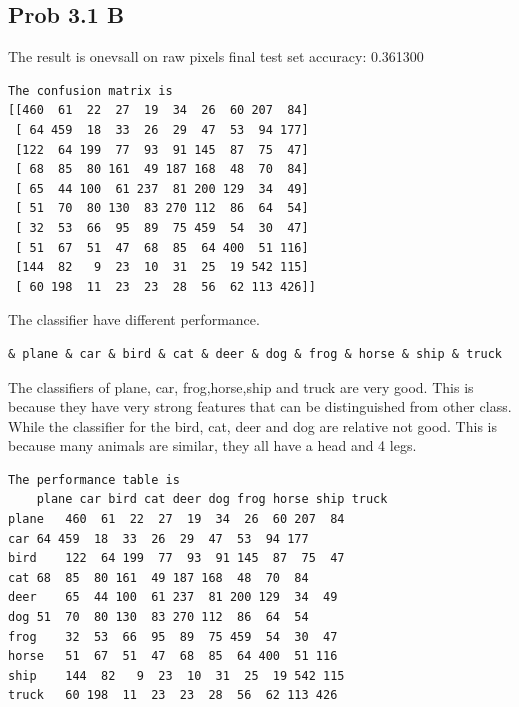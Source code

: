 \documentclass[pdftex,11pt]{article}
\begin{document}
\subsection{Prob 3.1 B }       
The result is 
onevsall on raw pixels final test set accuracy: 0.361300\\
\begin{lstlisting}    
The confusion matrix is 
[[460  61  22  27  19  34  26  60 207  84]
 [ 64 459  18  33  26  29  47  53  94 177]
 [122  64 199  77  93  91 145  87  75  47]
 [ 68  85  80 161  49 187 168  48  70  84]
 [ 65  44 100  61 237  81 200 129  34  49]
 [ 51  70  80 130  83 270 112  86  64  54]
 [ 32  53  66  95  89  75 459  54  30  47]
 [ 51  67  51  47  68  85  64 400  51 116]
 [144  82   9  23  10  31  25  19 542 115]
 [ 60 198  11  23  23  28  56  62 113 426]]
\end{lstlisting}    
The classifier have different performance.
\begin{lstlisting}
& plane & car & bird & cat & deer & dog & frog & horse & ship & truck
\end{lstlisting}
The classifiers of plane, car, frog,horse,ship and truck are very good. This is because they have very strong features that can be distinguished from other class.
While the classifier for the bird, cat, deer and dog are relative not good. This is because many animals are similar, they all have a head and 4 legs. 
\begin{lstlisting}    
The performance table is 
	plane car bird cat deer dog frog horse ship truck
plane	460  61  22  27  19  34  26  60 207  84
car	64 459  18  33  26  29  47  53  94 177
bird	122  64 199  77  93  91 145  87  75  47
cat	68  85  80 161  49 187 168  48  70  84
deer	65  44 100  61 237  81 200 129  34  49
dog	51  70  80 130  83 270 112  86  64  54
frog	32  53  66  95  89  75 459  54  30  47
horse	51  67  51  47  68  85  64 400  51 116
ship	144  82   9  23  10  31  25  19 542 115
truck	60 198  11  23  23  28  56  62 113 426
\end{lstlisting}    
\end{document}
